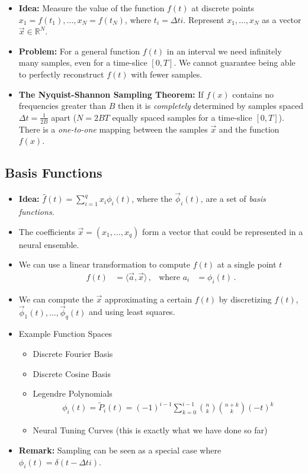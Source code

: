 \documentclass[10pt,letterpaper,oneside]{article}
\begin{document}
\begin{itemize}
	\item \textbf{Idea:} Measure the value of the function $f(t)$ at discrete points $x_1 = f(t_1), \ldots, x_N = f(t_N)$, where $t_i = \Delta t i$. Represent $x_1, \ldots, x_N$ as a vector $\vec x \in \mathbb{R}^N$.
	\item \textbf{Problem:} For a general function $f(t)$ in an interval we need infinitely many samples, even for a time-slice $[0, T]$. We cannot guarantee being able to perfectly reconstruct $f(t)$ with fewer samples.
	\item \textbf{The Nyquist-Shannon Sampling Theorem:} If $f(x)$ contains no frequencies greater than $B$ then it is \emph{completely} determined by samples spaced $\Delta t = \frac{1}{2B}$ apart ($N = 2BT$ equally spaced samples for a time-slice $[0, T]$). There is a \emph{one-to-one} mapping between the samples $\vec x$ and the function $f(x)$.
\end{itemize}

\subsection{Basis Functions}

\begin{itemize}
	\item \textbf{Idea:} $\hat f(t) = \sum_{i = 1}^q x_i \phi_i(t)$, where the $\vec \phi_i(t)$, are a set of \emph{basis functions}.
	\item The coefficients $\vec x = (x_1, \ldots, x_q)$ form a vector that could be represented in a neural ensemble.
	\item We can use a linear transformation to compute $f(t)$ at a single point $t$
	\begin{align*}
		f(t) &= \langle \vec a, \vec x \rangle \,, & \text{where } a_i &= \phi_i(t) \,.
	\end{align*}
	\item We can compute the $\vec x$ approximating a certain $f(t)$ by discretizing $f(t)$, $\vec \phi_1(t), \ldots, \vec \phi_q(t)$ and using least squares.
	\item Example Function Spaces
	\begin{itemize}
		\item Discrete Fourier Basis
		\item Discrete Cosine Basis
		\item Legendre Polynomials
		\begin{align*}
			\phi_i(t) = \tilde P_i(t) = (-1)^{i - 1} \sum_{k=0}^{i - 1} \binom{n}{k} \binom{n + k}{k} (-t)^{k}
		\end{align*}
		\item Neural Tuning Curves (this is exactly what we have done so far)
	\end{itemize}
	\item \textbf{Remark:} Sampling can be seen as a special case where $\phi_i(t) = \delta(t - \Delta t i)$.
\end{itemize}
\end{document}

